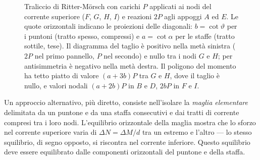\begin{figure}[htbp]
	\caption{Traliccio di Ritter-M\"{o}rsch con carichi $P$ applicati
		ai nodi del corrente superiore ($F$, $G$, $H$, $I$)
		e reazioni $2P$ agli appoggi $A$ ed $E$.
		Le quote orizzontali indicano le proiezioni delle
		diagonali: $b = \cot\vartheta$ per i puntoni
		(tratto spesso, compressi) e $a = \cot\alpha$
		per le staffe (tratto sottile, tese).
		Il diagramma del taglio è positivo nella metà
		sinistra ($2P$ nel primo pannello, $P$ nel secondo)
		e nullo tra i nodi $G$ e $H$; per antisimmetria
		è negativo nella metà destra.
		Il poligono del momento ha tetto piatto di valore
		$(a+3b)P$ tra $G$ e $H$, dove il taglio è nullo,
		e valori nodali $(a+2b)P$ in $B$ e $D$, $2bP$
		in $F$ e $I$.}
	\label{fig:traliccio_Morsch}
\end{figure}

Un approccio alternativo, più diretto, consiste
nell'isolare la \emph{maglia elementare} delimitata
da un puntone e da una staffa consecutivi e dai
tratti di corrente compresi tra i loro nodi.
L'equilibrio orizzontale della maglia mostra che
lo sforzo nel corrente superiore varia di
$\Delta N = \Delta M / d$ tra un estremo e l'altro
--- lo stesso squilibrio, di segno opposto, si
riscontra nel corrente inferiore. Questo squilibrio
deve essere equilibrato dalle componenti orizzontali
del puntone e della staffa.

